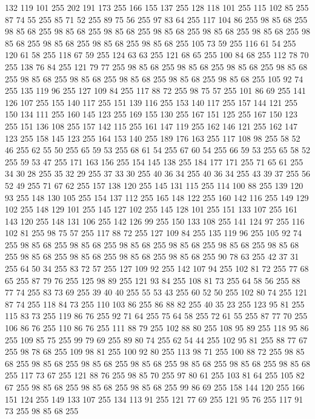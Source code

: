 132 119 101 255 202 191 173 255 166 155 137 255 128 118 101 255 115 102 85 255 87 74 55 255 85 71 52 255 89 75 56 255 97 83 64 255 117 104 86 255 98 85 68 255 98 85 68 255 98 85 68 255 98 85 68 255 98 85 68 255 98 85 68 255 98 85 68 255 98 85 68 255 98 85 68 255 98 85 68 255 98 85 68 255 105 73 59 255 116 61 54 255 120 61 58 255 118 67 59 255 124 63 63 255 121 68 65 255 100 84 68 255 112 78 70 255 138 76 84 255 121 79 77 255 98 85 68 255 98 85 68 255 98 85 68 255 98 85 68 255 98 85 68 255 98 85 68 255 98 85 68 255 98 85 68 255 98 85 68 255 105 92 74 255 135 119 96 255 127 109 84 255 117 88 72 255 98 75 57 255 101 86 69 255 141 126 107 255 155 140 117 255 151 139 116 255 153 140 117 255 157 144 121 255 150 134 111 255 160 145 123 255 169 155 130 255 167 151 125 255 167 150 123 255 151 136 108 255 157 142 115 255 161 147 119 255 162 146 121 255 162 147 123 255 158 145 123 255 164 153 140 255 189 176 163 255
117 108 98 255 58 52 46 255 62 55 50 255 65 59 53 255 68 61 54 255 67 60 54 255 66 59 53 255 65 58 52 255 59 53 47 255 171 163 156 255 154 145 138 255 184 177 171 255 71 65 61 255 34 30 28 255 35 32 29 255 37 33 30 255 40 36 34 255 40 36 34 255 43 39 37 255 56 52 49 255 71 67 62 255 157 138 120 255 145 131 115 255 114 100 88 255 139 120 93 255 148 130 105 255 154 137 112 255 165 148 122 255 160 142 116 255 149 129 102 255 148 129 101 255 145 127 102 255 145 128 101 255 151 133 107 255 161 143 120 255 148 131 106 255 142 126 99 255 150 133 108 255 141 124 97 255 116 102 81 255 98 75 57 255 117 88 72 255 127 109 84 255 135 119 96 255 105 92 74 255 98 85 68 255 98 85 68 255 98 85 68 255 98 85 68 255 98 85 68 255 98 85 68 255 98 85 68 255 98 85 68 255 98 85 68 255 98 85 68 255 90 78 63 255 42 37 31 255 64 50 34 255 83 72 57 255 127 109 92 255 142 107 94 255 102 81 72 255 77 68 65 255 87 79 76 255
125 98 89 255 121 93 84 255 108 81 73 255 64 58 56 255 88 77 74 255 83 73 69 255 39 40 40 255 55 53 43 255 60 52 50 255 102 80 74 255 121 87 74 255 118 84 73 255 110 103 86 255 86 88 82 255 40 35 23 255 123 95 81 255 115 83 73 255 119 86 76 255 92 71 64 255 75 64 58 255 72 61 55 255 87 77 70 255 106 86 76 255 110 86 76 255 111 88 79 255 102 88 80 255 108 95 89 255 118 95 86 255 109 85 75 255 99 79 69 255 89 80 74 255 62 54 44 255 102 95 81 255 88 77 67 255 98 78 68 255 109 98 81 255 100 92 80 255 113 98 71 255 100 88 72 255 98 85 68 255 98 85 68 255 98 85 68 255 98 85 68 255 98 85 68 255 98 85 68 255 98 85 68 255 117 73 67 255 121 88 76 255 98 85 70 255 97 80 61 255 103 81 64 255 105 82 67 255 98 85 68 255 98 85 68 255 98 85 68 255 99 86 69 255 158 144 120 255 166 151 124 255 149 133 107 255 134 113 91 255 121 77 69 255 121 95 76 255 117 91 73 255 98 85 68 255

